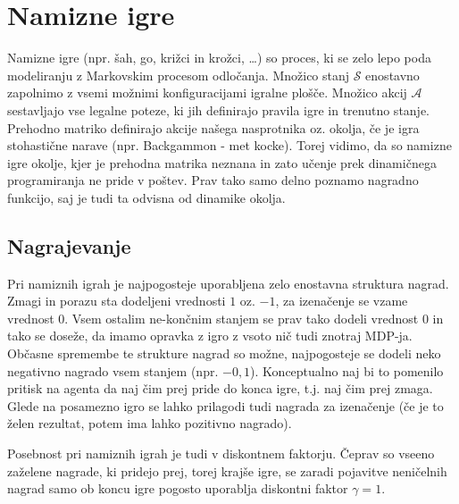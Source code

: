 \documentclass[12pt,a4paper]{amsart}
\theoremstyle{definition} %
\theoremstyle{plain} %
\begin{document}
\section{Namizne igre}
Namizne igre (npr. šah, go, križci in krožci, \dots) so proces, ki se zelo lepo poda modeliranju z 
Markovskim procesom odločanja. Množico stanj $\mathcal{S}$ enostavno zapolnimo z vsemi možnimi 
konfiguracijami igralne plošče. Množico akcij $\mathcal{A}$ sestavljajo vse legalne poteze, ki jih 
definirajo pravila igre in trenutno stanje. Prehodno matriko definirajo akcije našega nasprotnika oz. 
okolja, če je igra stohastične narave (npr. Backgammon - met kocke). Torej vidimo, da so namizne igre
okolje, kjer je prehodna matrika neznana in zato učenje prek dinamičnega programiranja ne pride v 
poštev. Prav tako samo delno poznamo nagradno funkcijo, saj je tudi ta odvisna od dinamike okolja.  

\subsection{Nagrajevanje}
Pri namiznih igrah je najpogosteje uporabljena zelo enostavna struktura nagrad. Zmagi in porazu sta 
dodeljeni vrednosti $1$ oz. $-1$, za izenačenje se vzame vrednost $0$. Vsem ostalim ne-končnim stanjem
se prav tako dodeli vrednost $0$ in tako se doseže, da imamo opravka z igro z vsoto nič tudi znotraj 
MDP-ja. Občasne spremembe te strukture nagrad so možne, najpogosteje se dodeli neko negativno nagrado 
vsem stanjem (npr. $-0,1$). Konceptualno naj bi to pomenilo pritisk na agenta da naj čim prej pride do 
konca igre, t.j. naj čim prej zmaga. Glede na posamezno igro se lahko prilagodi tudi nagrada za 
izenačenje (če je to želen rezultat, potem ima lahko pozitivno nagrado).

Posebnost pri namiznih igrah je tudi v diskontnem faktorju. Čeprav so vseeno zaželene nagrade, ki 
pridejo prej, torej krajše igre, se zaradi pojavitve neničelnih nagrad samo ob koncu igre pogosto 
uporablja diskontni faktor $\gamma = 1$.
\end{document}
